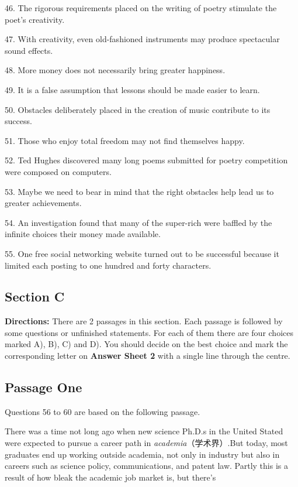 \documentclass[UTF8,11pt]{ctexart}
\begin{document}
46. The rigorous requirements placed on the writing of poetry stimulate the poet’s creativity.


47. With creativity, even old-fashioned instruments may produce spectacular sound effects.


48. More money does not necessarily bring greater happiness.


49. It is a false assumption that lessons should be made easier to learn.


50. Obstacles deliberately placed in the creation of music contribute to its success.


51. Those who enjoy total freedom may not find themselves happy.


52. Ted Hughes discovered many long poems submitted for poetry competition were composed on computers.


53. Maybe we need to bear in mind that the right obstacles help lead us to greater achievements.


54. An investigation found that many of the super-rich were baffled by the infinite choices their money made available.


55. One free social networking website turned out to be successful because it limited each posting to one hundred and forty characters.


\subsection*{\textbf{Section C}}


\textbf{Directions:} There are 2 passages in this section. Each passage is followed by some questions or unfinished statements. For each of them there are four choices marked A), B), C) and D). You should decide on the best choice and mark the corresponding letter on\textbf{ Answer Sheet 2} with a single line through the centre.


\subsection*{Passage One}


Questions 56 to 60 are based on the following passage.


There was a time not long ago when new science Ph.D.s in the United Stated were expected to pursue a career path in \textit{academia}（学术界）.But today, most graduates end up working outside academia, not only in industry but also in careers such as science policy, communications, and patent law. Partly this is a result of how bleak the academic job market is, but there’s
\end{document}

